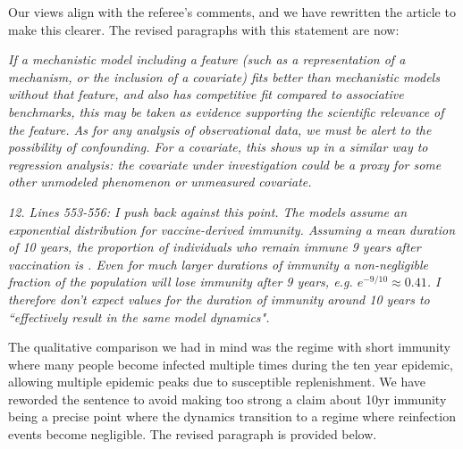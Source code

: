\documentclass[11pt]{article}
\newcommand\report[1]{{\color{mygreen} \vspace{1mm}\hspace{0.25in}\parbox{6in}{\em #1}}}
\newcommand\article[1]{{\color{blue} \vspace{1mm}\hspace{0.25in}\parbox{6in}{\em #1}}}
\begin{document}
Our views align with the referee's comments, and we have rewritten the article to make this clearer. The revised paragraphs with this statement are now:

\article{If a mechanistic model including a feature (such as a representation of a mechanism, or the inclusion of a covariate) fits better than mechanistic models without that feature, and also has competitive fit compared to associative benchmarks, this may be taken as evidence supporting the scientific relevance of the feature.
As for any analysis of observational data, we must be alert to the possibility of confounding.
For a covariate, this shows up in a similar way to regression analysis: the covariate under investigation could be a proxy for some other unmodeled phenomenon or unmeasured covariate.}

\article{\editConfound}

\report{12.
  Lines 553-556: I push back against this point. The models assume an exponential distribution for vaccine-derived immunity. Assuming a mean duration of 10 years, the proportion of individuals who remain immune 9 years after vaccination is . Even for much larger durations of immunity a non-negligible fraction of the population will lose immunity after 9 years, e.g. $e^{-9/10}\approx 0.41$. I therefore don't expect values for the duration of immunity around 10 years to ``effectively result in the same model dynamics".
}

The qualitative comparison we had in mind was the regime with short immunity where many people become infected multiple times during the ten year epidemic, allowing multiple epidemic peaks due to susceptible replenishment.
We have reworded the sentence to avoid making too strong a claim about 10yr immunity being a precise point where the dynamics transition to a regime where reinfection events become negligible.
The revised paragraph is provided below.
\end{document}
